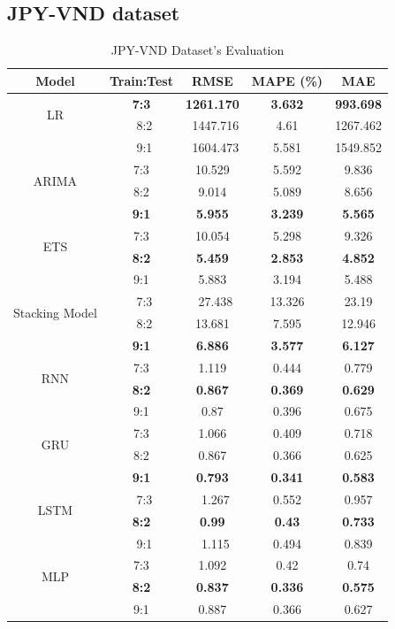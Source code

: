 \documentclass{ieeeojies}
\begin{document}
\subsection{JPY-VND dataset} 
\begin{table}[H]
    \centering
    \begin{tabular}{|c|c|c|c|c|}
         \hline
         \centering Model & Train:Test & RMSE & MAPE (\%) & MAE\\
         \hline
         \multirow{2}{*}{LR} &\textbf{7:3} &\textbf{1261.170		} &\textbf{3.632} &\textbf{993.698} \\ &\ 8:2 &\ 1447.716	&4.61	&1267.462 \\&\ 9:1 &\ 1604.473	&5.581	&1549.852 \\
         \hline
         \multirow{2}{*}{ARIMA} & 7:3 & 10.529 & 5.592 & 9.836 \\ & 8:2 & 9.014 & 5.089 & 8.656 \\& \textbf{9:1} & \textbf{5.955} & \textbf{3.239} & \textbf{5.565} \\
         \hline
         \multirow{2}{*}{ETS} & 7:3 & 10.054&5.298&9.326 \\ & \textbf{8:2} &\textbf{5.459}&\textbf{2.853} &\textbf{4.852} \\& 9:1 &5.883&3.194&5.488 \\
         \hline
         \multirow{2}{*}{Stacking Model} &\ 7:3 &\ 27.438	&13.326	&23.19 \\&\ 8:2 &13.681	&7.595&	12.946\\ & \textbf{9:1} &\textbf{6.886} &\textbf{3.577} &\textbf{6.127}\\
         \hline
         \multirow{2}{*}{RNN} & 7:3 & 1.119 & 0.444 & 0.779 \\ &\textbf{8:2} & \textbf{0.867} & \textbf{0.369} & \textbf{0.629} \\ & 9:1 & 0.87 & 0.396 & 0.675 \\
         \hline
         \multirow{2}{*}{GRU} & 7:3 & 1.066 & 0.409 & 0.718 \\ & 8:2 & 0.867 & 0.366 & 0.625 \\ &\textbf{9:1} & \textbf{0.793} & \textbf{0.341} & \textbf{0.583} \\
         \hline
         \multirow{2}{*}{LSTM} &\ 7:3 &\ 1.267	&0.552	&0.957  \\&\textbf{8:2}&\textbf{0.99} &\textbf{0.43} &\textbf{0.733} \\ &\ 9:1 &\ 1.115&	0.494&	0.839\\
         \hline
         \multirow{2}{*}{MLP} & 7:3 & 1.092 & 0.42 & 0.74 \\ &\textbf{8:2} & \textbf{0.837} & \textbf{0.336} & \textbf{0.575} \\ & 9:1 & 0.887 & 0.366 & 0.627 \\
         \hline
    \end{tabular}
    \caption{JPY-VND Dataset's Evaluation}
    \label{mbbresult}
\end{table}
\end{document}
